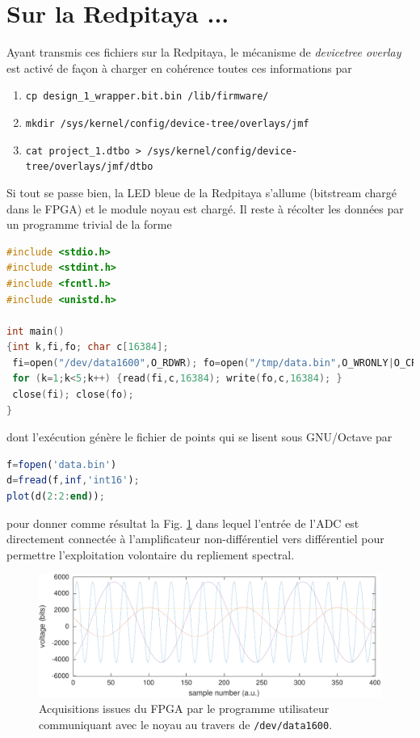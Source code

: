 \documentclass[12pt,oneside]{article}
\begin{document}
\section{Sur la Redpitaya ...}

Ayant transmis ces fichiers sur la Redpitaya, le m\'ecanisme de {\em devicetree overlay}
est activ\'e de fa\c con \`a charger en coh\'erence toutes ces informations par
\begin{enumerate}
\item {\tt cp design\_1\_wrapper.bit.bin /lib/firmware/}
\item {\tt mkdir /sys/kernel/config/device-tree/overlays/jmf}
\item {\tt cat project\_1.dtbo > /sys/kernel/config/device-tree/overlays/jmf/dtbo}
\end{enumerate}

Si tout se passe bien, la LED bleue de la Redpitaya s'allume (bitstream charg\'e dans le FPGA)
et le module noyau est charg\'e. Il reste \`a r\'ecolter les donn\'ees par un programme trivial
de la forme

\begin{lstlisting}[language=C]
#include <stdio.h>
#include <stdint.h>
#include <fcntl.h>
#include <unistd.h>

int main()
{int k,fi,fo; char c[16384];
 fi=open("/dev/data1600",O_RDWR); fo=open("/tmp/data.bin",O_WRONLY|O_CREAT);
 for (k=1;k<5;k++) {read(fi,c,16384); write(fo,c,16384); }
 close(fi); close(fo);
}
\end{lstlisting}

dont l'ex\'ecution g\'en\`ere le fichier de points qui se lisent sous GNU/Octave par
\begin{lstlisting}[language=Octave]
f=fopen('data.bin')
d=fread(f,inf,'int16');
plot(d(2:2:end));
\end{lstlisting}

pour donner comme r\'esultat la Fig. \ref{adc} dans lequel l'entr\'ee de l'ADC est
directement connect\'ee \`a l'amplificateur non-diff\'erentiel vers diff\'erentiel
pour permettre l'exploitation volontaire du repliement spectral.

\begin{figure}[h!tb]
\includegraphics[width=\linewidth]{mesures}
\caption{Acquisitions issues du FPGA par le programme utilisateur communiquant avec
le noyau au travers de {\tt /dev/data1600}.}
\label{adc}
\end{figure}
\end{document}
